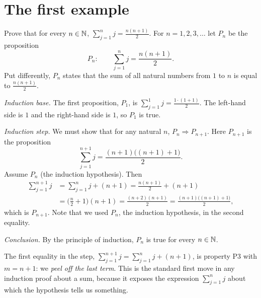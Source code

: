 \section{The first example}\label{sec:ind-first}

\begin{example}
Prove that for every $n\in\mathbb{N}$, $\displaystyle\sum_{j=1}^{n}j=\frac{n(n+1)}{2}$. 
\solution
For $n=1,2,3,\dots$ let $P_n$ be the proposition
\[
P_n:\qquad \sum_{j=1}^{n}j=\frac{n(n+1)}{2}.
\]
Put differently, $P_n$ states that the sum of all natural numbers from $1$ to $n$ is equal to $\frac{n(n+1)}2$.

\emph{Induction base.} The first proposition, $P_1$, is $\sum_{j=1}^{1}j=\frac{1\cdot(1+1)}2$. The left-hand side is $1$ and
the right-hand side is $1$, so $P_1$ is true.

\emph{Induction step.} We must show that for any natural $n$, $P_n\Rightarrow P_{n+1}$. Here $P_{n+1}$ is the proposition
\[
\sum_{j=1}^{n+1}j=\frac{(n+1)\big((n+1)+1\big)}{2}.
\]
Assume $P_n$ (the induction hypothesis). Then
\begin{align*}
\sum_{j=1}^{n+1}j&=\sum_{j=1}^{n}j+(n+1)=\frac{n(n+1)}{2}+(n+1)\\
&=\Big(\frac n2+1\Big)(n+1)=\frac{(n+2)(n+1)}{2}=\frac{(n+1)\big((n+1)+1\big)}{2},
\end{align*}
which is $P_{n+1}$. Note that we used $P_n$, the induction hypothesis, in the second equality.

\emph{Conclusion.} By the principle of induction, $P_n$ is true for every $n\in\mathbb{N}$.
\end{example}

The first equality in the step, $\sum_{j=1}^{n+1}j=\sum_{j=1}^{n}j+(n+1)$, is property P3 with $m=n+1$: we
\emph{peel off the last term}. This is the standard first move in any induction proof about a sum, because it exposes
the expression $\sum_{j=1}^n j$ about which the hypothesis tells us something.

